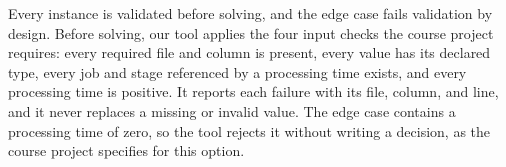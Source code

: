 \sumpara Every instance is validated before solving, and the edge case fails validation by design. \sumparaend
\fin Before solving, our tool applies the four input checks the course project requires: every required file and column is present, every value has its declared type, every job and stage referenced by a processing time exists, and every processing time is positive. \fine
\fin It reports each failure with its file, column, and line, and it never replaces a missing or invalid value. \fine
\fin The edge case contains a processing time of zero, so the tool rejects it without writing a decision, as the course project specifies for this option. \fine
